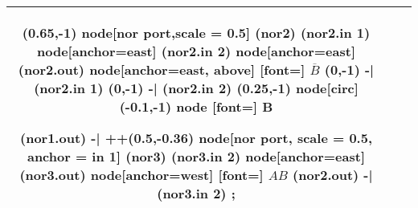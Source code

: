 \documentclass[9 pt]{article}
\begin{document}
\begin{multicols*}{4}
\begin{tabular}[c]{|c|c|c|}
\begin{circuitikz}
			(0.65,-1) node[nor port,scale = 0.5] (nor2) {}
			(nor2.in 1) node[anchor=east] {}
			(nor2.in 2) node[anchor=east] {}
			(nor2.out) node[anchor=east, above] [font=\fontsize{7}{0}\selectfont] {$\overline{B}$}
			(0,-1) -| (nor2.in 1)
			(0,-1) -| (nor2.in 2)
			(0.25,-1) node[circ]{}
			(-0.1,-1) node [font=\fontsize{7}{0}\selectfont] {B}

			(nor1.out) -| ++(0.5,-0.36) node[nor port, scale = 0.5, anchor = in 1] (nor3) {}
			(nor3.in 2) node[anchor=east] {}
			(nor3.out) node[anchor=west] [font=\fontsize{7}{0}\selectfont] {$AB$}
			(nor2.out) -| (nor3.in 2)
	;\end{circuitikz}\\
	\hline
\end{tabular}


\end{multicols*}
\end{document}
